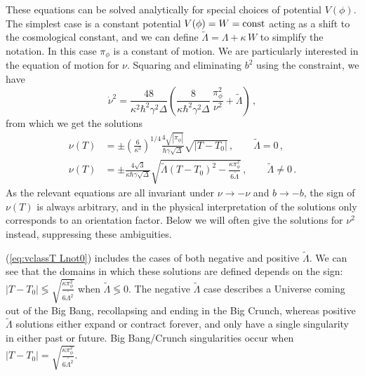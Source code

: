 \documentclass[aps,prd,11pt,showkeys,nofootinbib]{revtex4-2}
\begin{document}
These equations can be solved analytically for special choices of potential $V(\phi)$. The simplest case is a constant potential $V(\phi)=W={\rm const}$ acting as a shift to the cosmological constant, and we can define $\tilde\Lambda=\Lambda+\kappa\, W$ to simplify the notation. In this case $\pi_\phi$ is a constant of motion. We are particularly interested in the equation of motion for $\nu$. Squaring and eliminating $b^2$ using the constraint, we have
\begin{equation}
\label{eq:classicaluniFried}
    \dot \nu^2 =\frac{48}{\kappa^2\hbar^2\gamma^2 \Delta}\left( \frac{8}{\kappa\hbar^2\gamma^2\Delta}\,\frac{\pi_\phi^2}{\nu^2}+\tilde{\Lambda}\right)\,,
\end{equation}
from which we get the solutions
\begin{align}
    \nu(T) &= \pm \left(\frac{6}{\kappa^3 }\right)^{1/4} \frac{4\sqrt{|\pi_\phi|}}{\hbar\gamma\sqrt{\Delta}}\sqrt{|T-T_0|}\,,\qquad \tilde{\Lambda} = 0\,,\label{eq:vclassT L0}\\
    \nu(T) &= \pm \frac{4\sqrt{3}}{\kappa\hbar\gamma\sqrt{\Delta}}\sqrt{\tilde{\Lambda}(T-T_0)^2-\frac{\kappa\pi_\phi^2}{6\tilde{\Lambda}}}\,,\qquad \tilde{\Lambda}\neq 0\,.\label{eq:vclassT Lnot0}
\end{align}
As the relevant equations are all invariant under $\nu\rightarrow -\nu$ and $b\rightarrow -b$, the sign of $\nu(T)$ is always arbitrary, and in the physical interpretation of the solutions only corresponds to an orientation factor. Below we will often give the solutions for $\nu^2$ instead, suppressing these ambiguities.

(\ref{eq:vclassT Lnot0}) includes the cases of both negative and positive $\tilde\Lambda$. We can see that the domains in which these solutions are defined depends on the sign:  $|T-T_0| \lessgtr \sqrt{\frac{\kappa \pi_\phi^2}{6 \tilde{\Lambda^2}}}$ when $\tilde{\Lambda}\lessgtr 0$. The negative $\tilde\Lambda$ case describes a Universe coming out of the Big Bang, recollapsing and ending in the Big Crunch, whereas positive $\tilde\Lambda$ solutions either expand or contract forever, and only have a single singularity in either past or future. Big Bang/Crunch singularities occur when $|T-T_0| = \sqrt{\frac{\kappa \pi_\phi^2}{6 \tilde{\Lambda^2}}}.$
\end{document}
